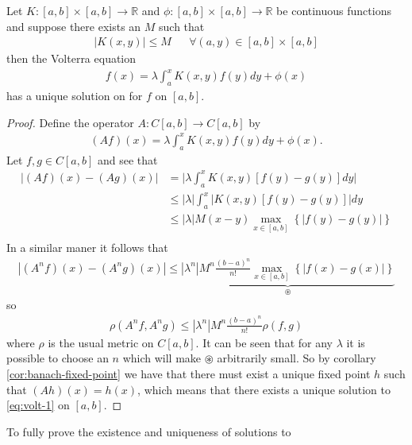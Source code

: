 \documentclass{article}
\begin{document}
\begin{lemma}
	Let $ K : [a,b] \times [a,b] \longrightarrow \mathbb{R} $ and $ \phi : [a,b] \times [a,b] \longrightarrow \mathbb{R} $ 
	be continuous functions and suppose there exists an $ M $ such that
	\begin{align*}
		|K(x,y)| \leq M & & \forall (a,y) \in [a,b] \times [a,b] 
	\end{align*}
	then the Volterra equation 
	\begin{align}
		\label{eq:volt-1}
		f(x) = \lambda \int_a^x K(x,y) f(y)dy + \phi(x) 
	\end{align}
	has a unique solution on for $ f $ on $ [a, b] $.
\end{lemma}
\begin{proof}
	Define the operator $ A : C[a,b] \longrightarrow C[a,b] $ 
	by
	\begin{align*}
		(Af)(x) = \lambda \int_a^x K(x,y)f(y)dy + \phi(x). 
	\end{align*}
	Let $ f, g \in C[a,b] $ and see that
	\begin{align*}
		|(Af)(x) - (Ag)(x)| &= \vert \lambda \int_a^x K(x,y)[f(y) - g(y)]dy \vert \\
			&\leq | \lambda | \int_a^x|K(x,y)[ f(y)-g(y)]|dy \\
			&\leq | \lambda | M(x-y) \max_{x\in [a,b]} \left\{ |f(y) - g(y) |\right\} \\
	\end{align*}
	In a similar maner it follows that
	\begin{align*}
		|(A^nf)(x) - (A^ng)(x)| \leq \underbrace{|\lambda^n|M^n \frac{(b-a)^n}{n!}\max_{x\in[a,b]}\left\{ | f(x) - g(x) | \right\}}_{\circledast}
	\end{align*}
	so 
	\begin{align*}
		\rho(A^nf, A^ng) \leq |\lambda^n|M^n \frac{(b-a)^n}{n!}\rho(f,g)
	\end{align*}
	where $ \rho $ is the usual metric on $ C[a,b] $.
	It can be seen that for any $ \lambda $ it is possible to choose an $ n $ which will make $\circledast $ arbitrarily small.
	So by corollary \ref{cor:banach-fixed-point} we have that there must exist a unique fixed point $ h $ such that
	$ (Ah)(x) = h(x) $, which means that there exists a unique solution to \eqref{eq:volt-1} on $ [a, b] $.
\end{proof}

To fully prove the existence and uniqueness of solutions to 
\end{document}
